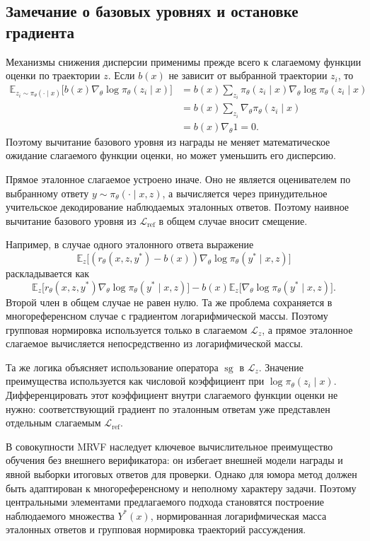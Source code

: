 \subsection{Замечание о базовых уровнях и остановке градиента}

Механизмы снижения дисперсии применимы прежде всего к слагаемому функции оценки по траектории \(z\). Если \(b(x)\) не зависит от выбранной траектории \(z_i\), то
\begin{align*}
    \mathbb{E}_{z_i\sim\pi_{\theta}(\cdot\mid x)}
    \big[
        b(x)
        \nabla_{\theta}
        \log\pi_{\theta}(z_i\mid x)
        \big]
     & =
    b(x)
    \sum_{z_i}
    \pi_{\theta}(z_i\mid x)
    \nabla_{\theta}
    \log\pi_{\theta}(z_i\mid x)
    \\
     & =
    b(x)
    \sum_{z_i}
    \nabla_{\theta}
    \pi_{\theta}(z_i\mid x)
    \\
     & =
    b(x)
    \nabla_{\theta}1
    =
    0.
\end{align*}
Поэтому вычитание базового уровня из награды не меняет математическое ожидание слагаемого функции оценки, но может уменьшить его дисперсию.

Прямое эталонное слагаемое устроено иначе. Оно не является оценивателем по выбранному ответу \(y\sim\pi_{\theta}(\cdot\mid x,z)\), а вычисляется через принудительное учительское декодирование наблюдаемых эталонных ответов. Поэтому наивное вычитание базового уровня из \(\mathcal{L}_{\mathrm{ref}}\) в общем случае вносит смещение.

Например, в случае одного эталонного ответа выражение
\[
    \mathbb{E}_{z}
    \Big[
        (r_{\theta}(x,z,y^{*})-b(x))
        \nabla_{\theta}
        \log\pi_{\theta}(y^{*}\mid x,z)
        \Big]
\]
раскладывается как
\[
    \mathbb{E}_{z}
    \Big[
        r_{\theta}(x,z,y^{*})
        \nabla_{\theta}
        \log\pi_{\theta}(y^{*}\mid x,z)
        \Big]
    -
    b(x)
    \mathbb{E}_{z}
    \Big[
        \nabla_{\theta}
        \log\pi_{\theta}(y^{*}\mid x,z)
        \Big].
\]
Второй член в общем случае не равен нулю. Та же проблема сохраняется в многореференсном случае с градиентом логарифмической массы. Поэтому групповая нормировка используется только в слагаемом \(\mathcal{L}_z\), а прямое эталонное слагаемое вычисляется непосредственно из логарифмической массы.

Та же логика объясняет использование оператора \(\operatorname{sg}\) в \(\mathcal{L}_z\). Значение преимущества используется как числовой коэффициент при \(\log\pi_{\theta}(z_i\mid x)\). Дифференцировать этот коэффициент внутри слагаемого функции оценки не нужно: соответствующий градиент по эталонным ответам уже представлен отдельным слагаемым \(\mathcal{L}_{\mathrm{ref}}\).

В совокупности MRVF наследует ключевое вычислительное преимущество обучения без внешнего верификатора: он избегает внешней модели награды и явной выборки итоговых ответов для проверки. Однако для юмора метод должен быть адаптирован к многореференсному и неполному характеру задачи. Поэтому центральными элементами предлагаемого подхода становятся построение наблюдаемого множества \(Y^{*}(x)\), нормированная логарифмическая масса эталонных ответов и групповая нормировка траекторий рассуждения.